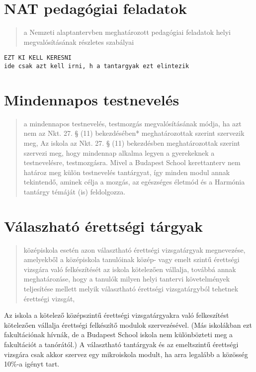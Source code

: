 \section{NAT pedagógiai
feladatok}\label{nat-pedaguxf3giai-feladatok}

\begin{quote}
a Nemzeti alaptantervben meghatározott pedagógiai feladatok helyi
megvalósításának részletes szabályai
\end{quote}

\texttt{EZT\ KI\ KELL\ KERESNI}
\texttt{ide\ csak\ azt\ kell\ irni,\ h\ a\ tantargyak\ ezt\ elintezik}

\section{Mindennapos testnevelés}\label{mindennapos-testneveluxe9s}

\begin{quote}
a mindennapos testnevelés, testmozgás megvalósításának módja, ha azt nem
az Nkt. 27. § (11) bekezdésében* meghatározottak szerint szervezik meg,
Az iskola az Nkt. 27. § (11) bekezdésben meghatározottak szerint
szervezi meg, hogy mindennap alkalma legyen a gyerekeknek a
testnevelésre, testmozgásra. Mivel a Budapest School kerettanterv nem
határoz meg külön testnevelés tantárgyat, így minden modul annak
tekintendő, aminek célja a mozgás, az egészséges életmód és a Harmónia
tantárgy témáját (is) feldolgozza.
\end{quote}

\section{Válaszható érettségi
tárgyak}\label{vuxe1laszhatuxf3-uxe9rettsuxe9gi-tuxe1rgyak}

\begin{quote}
középiskola esetén azon választható érettségi vizsgatárgyak megnevezése,
amelyekből a középiskola tanulóinak közép- vagy emelt szintű érettségi
vizsgára való felkészítését az iskola kötelezően vállalja, továbbá annak
meghatározáse, hogy a tanulók milyen helyi tantervi követelmények
teljesítése mellett melyik választható érettségi vizsgatárgyból tehetnek
érettségi vizsgát,
\end{quote}

Az iskola a kötelező középszintű érettségi vizsgatárgyakra való
felkeszítést kötelezően vállalja érettségi felkészítő modulok
szervezésével. (Más iskolákban ezt fakultációnak hívnák, de a Budapest
School iskola nem különbözteti meg a fakultációt a tanórától.) A
választható tantárgyak és az emeltszintű érettségi vizsgára csak akkor
szervez egy mikroiskola modult, ha arra legalább a közösség 10\%-a
igényt tart.

